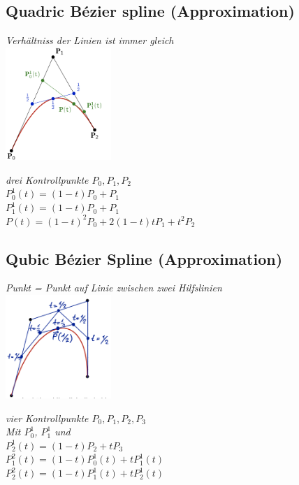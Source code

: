 \subsection{Quadric Bézier spline (Approximation)}
\textit{Verhältniss der Linien ist immer gleich}\\
\includegraphics[width=0.3\textwidth]{assets/quadratischeBesierSpline.png}

\textit{drei Kontrollpunkte $P_0, P_1, P_2$}\\

$P_0^1(t) = (1-t)P_0 + P_1$ \\
$P_1^1(t) = (1-t)P_0 + P_1$ \\

$P(t) = (1 - t)^2P_0 + 2(1 - t)tP_1 + t^2 P_2$

\subsection{Qubic Bézier Spline (Approximation)}
\textit{Punkt = Punkt auf Linie zwischen zwei Hilfslinien}\\
\includegraphics[width=0.3\textwidth]{assets/qubicBesierSpline.png}

\textit{vier Kontrollpunkte $P_0, P_1, P_2, P_3$}\\

\textit{Mit $P_0^1$, $P_1^1$ und} \\
$P_2^1(t) = (1-t)P_2 + tP_3$ \\

$P_1^2(t) = (1 - t) P_0^1(t) + tP_1^1(t)$ \\
$P_2^2(t) = (1 - t) P_1^1(t) + tP_2^1(t)$ \\

